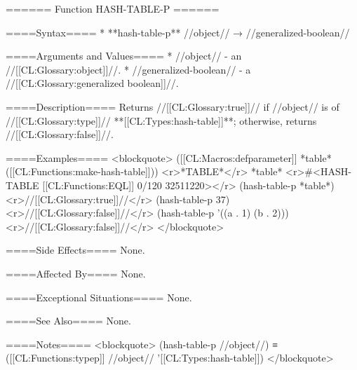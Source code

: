 ====== Function HASH-TABLE-P ======

====Syntax====
  * **hash-table-p** //object// → //generalized-boolean//

====Arguments and Values====
  * //object// - an //[[CL:Glossary:object]]//.
  * //generalized-boolean// - a //[[CL:Glossary:generalized boolean]]//.

====Description====
Returns //[[CL:Glossary:true]]// if //object// is of //[[CL:Glossary:type]]// **[[CL:Types:hash-table]]**; otherwise, returns //[[CL:Glossary:false]]//.

====Examples====
<blockquote>
([[CL:Macros:defparameter]] *table* ([[CL:Functions:make-hash-table]])) <r>*TABLE*</r>
*table* <r>#<HASH-TABLE [[CL:Functions:EQL]] 0/120 32511220></r>
(hash-table-p *table*) <r>//[[CL:Glossary:true]]//</r>
(hash-table-p 37) <r>//[[CL:Glossary:false]]//</r>
(hash-table-p '((a . 1) (b . 2))) <r>//[[CL:Glossary:false]]//</r>
</blockquote>

====Side Effects====
None.

====Affected By====
None.

====Exceptional Situations====
None.

====See Also====
None.

====Notes====
<blockquote>
(hash-table-p //object//) ≡ ([[CL:Functions:typep]] //object// '[[CL:Types:hash-table]])
</blockquote>

